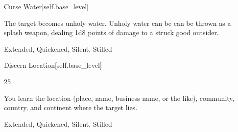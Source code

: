 \begin{spellsection}{Curse Water}[self.base_level]
\begin{spellcontent}
\begin{spelltargetinginfo}
\end{spelltargetinginfo}
\begin{spelleffects}
\spelleffect
The target becomes unholy water.
Unholy water can be can be thrown as a splash weapon, dealing 1d8 points of damage to a struck good outsider.
\end{spelleffects}
\end{spellcontent}
\begin{spellfooter}
 Extended, Quickened, Silent, Stilled
\end{spellfooter}
\begin{spellsubcontent}
\end{spellsubcontent}
\end{spellsection}
\begin{spellsection}{Discern Location}[self.base_level]
\begin{spellcontent}
\begin{spelltargetinginfo}
 25
\end{spelltargetinginfo}
\begin{spelleffects}
\spelleffect
You learn the location (place, name, business name, or the like), community, country, and continent where the target lies.
\end{spelleffects}
\end{spellcontent}
\begin{spellfooter}
 Extended, Quickened, Silent, Stilled
\end{spellfooter}
\begin{spellsubcontent}
\end{spellsubcontent}
\end{spellsection}
